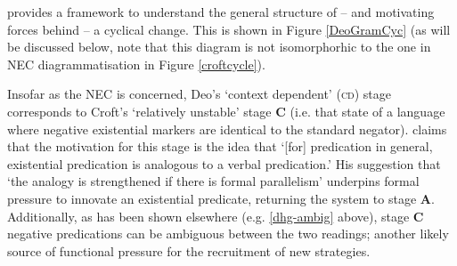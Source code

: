 \documentclass[usenames,dvipsnames,11pt]{article}
\begin{document}
{\begin{figure}[h]

\end{figure}


 \citet{Deo2015a} provides a framework to understand the general structure of -- and motivating forces behind -- a cyclical change. This is shown in Figure \ref{DeoGramCyc} (as will be discussed below, note that this diagram is not isomorphorhic to the one in NEC diagrammatisation in Figure \ref{croftcycle}).%

Insofar as the NEC is concerned, Deo's `context dependent' (\textsc{cd}) stage corresponds to Croft's `relatively unstable' stage \textbf{C} (i.e. that state of a language where negative existential markers are identical to the standard negator). \citet[19]{Croft1991} claims that the motivation for this stage is the idea that `[for] predication in general, existential predication is analogous to a verbal predication.' His suggestion that `the analogy is strengthened if there is formal parallelism' underpins formal pressure to innovate an existential predicate, returning the system to stage \textbf{A}. Additionally, as has been shown elsewhere (e.g. \ref{dhg-ambig} above), stage \textbf{C} negative predications can be ambiguous between the two readings; another likely source of functional pressure for the recruitment of new strategies.

}
\end{document}
